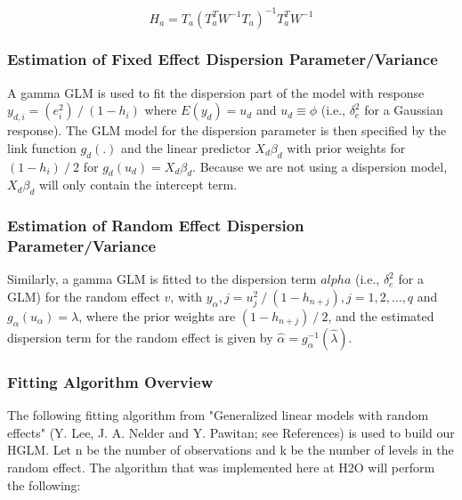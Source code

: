 $$H_a=T_a (T_a^T W^{-1} T_a )^{-1} T_a^T W^{-1}$$

\subsubsection{Estimation of Fixed Effect Dispersion Parameter/Variance}

A gamma GLM is used to fit the dispersion part of the model with response $y_{d,i}=(e_i^2)⁄(1-h_i )$ where $E(y_d )=u_d$ and $u_d\equiv \phi$ (i.e., $\delta_e^2$ for a Gaussian response). The GLM model for the dispersion parameter is then specified by the link function $g_d (.)$ and the linear predictor $X_d \beta_d$ with prior weights for $(1-h_i )⁄2$ for $g_d (u_d )=X_d \beta_d$. Because we are not using a dispersion model, $X_d \beta_d$ will only contain the intercept term.

\subsubsection{Estimation of Random Effect Dispersion Parameter/Variance}

Similarly, a gamma GLM is fitted to the dispersion term $alpha$ (i.e., $\delta_e^2$ for a GLM) for the random effect $v$, with $y_\alpha,j = u_j^2⁄(1-h_{n+j}), j=1,2,\ldots ,q$ and $g_\alpha (u_\alpha )=\lambda$, where the prior weights are $(1-h_{n+j} )⁄2$, and the estimated dispersion term for the random effect is given by $\hat \alpha = g_\alpha ^{-1}(\hat \lambda)$.

\subsubsection{Fitting Algorithm Overview}

The following fitting algorithm from "Generalized linear models with random effects" (Y. Lee, J. A. Nelder and Y. Pawitan; see References) is used to build our HGLM. Let n be the number of observations and k be the number of levels in the random effect. The algorithm that was implemented here at H2O will perform the following:


